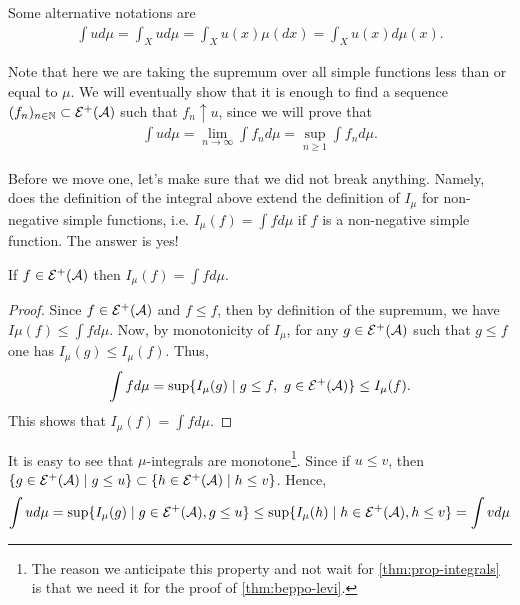 Some alternative notations are
\begin{align*}
	\int u d\mu = \int_X u d\mu = \int_X u(x) \mu(dx) = \int_X u(x) d \mu(x).
\end{align*}

Note that here we are taking the supremum over all simple functions less than or equal to $\mu$. We will eventually show that it is enough to find a sequence $(f_n)_{n\in\mathbb{N}} \subset \mathcal{E}^+(\mathcal{A})$ such that $f_n \uparrow u$, since we will prove that
\begin{align*}
	\int u d\mu = \lim_{n\to \infty} \int f_n d\mu = \sup_{n \geq 1} \int f_n d\mu.
\end{align*}

Before we move one, let's make sure that we did not break anything. Namely, does the definition of the integral above extend the definition of $I_\mu$ for non-negative simple functions, i.e. $I_\mu(f) = \int f d\mu$ if $f$ is a non-negative simple function. The answer is yes!

\begin{lem}
	\label{lem:def-integral-simple}
	If $f \in \mathcal{E}^+(\mathcal{A})$ then $I_\mu(f) = \int f d\mu$.
\end{lem}

\begin{proof}
	Since $f \in \mathcal{E}^+(\mathcal{A})$ and $f \leq f$, then by definition of the supremum, we have $I\mu(f) \leq \int f d\mu$. Now, by monotonicity of $I_\mu$, for any $g \in \mathcal{E}^+(\mathcal{A})$ such that $g \leq f$ one has $I_\mu(g) \leq I_\mu(f)$. Thus,
	\begin{align*}
		\int f d\mu = \sup \{ I_\mu(g) \mid g \leq f,\ g \in \mathcal{E}^+(\mathcal{A})\} \leq I_\mu(f).
	\end{align*}
	This shows that $I_\mu(f) = \int f d\mu$.
\end{proof}

\begin{remark}
	\label{rem:mu-integrals-monotone}
	It is easy to see that $\mu$-integrals are monotone\footnote{The reason we anticipate this property and not wait for \autoref{thm:prop-integrals} is that we need it for the proof of \autoref{thm:beppo-levi}.}. Since if $u \leq v$, then $\{g \in \mathcal{E}^+(\mathcal{A}) \mid g \leq u\} \subset \{h \in \mathcal{E}^+(\mathcal{A}) \mid h \leq v\}$. Hence,
	\begin{align*}
		\int u d\mu = \sup \{I_\mu(g) \mid g \in \mathcal{E}^+(\mathcal{A}), g \leq u\} \leq \sup \{I_\mu(h) \mid h \in \mathcal{E}^+(\mathcal{A}), h \leq v\} = \int v d\mu
	\end{align*}
\end{remark}

